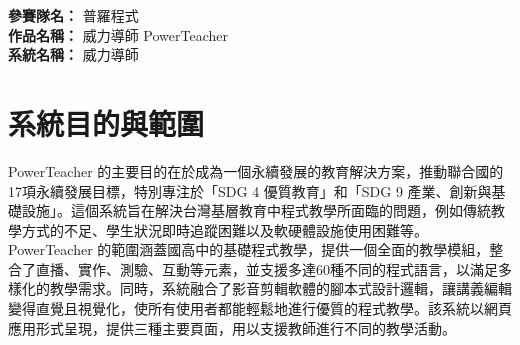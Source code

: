 \documentclass[12pt]{article}
\begin{document}
\date{}
\usetikzlibrary{automata, positioning, arrows}
{}
\renewcommand{\arraystretch}{1.25}

\noindent
\textbf{參賽隊名：} 普羅程式 \\
\textbf{作品名稱：} 威力導師 PowerTeacher \\
\textbf{系統名稱：} 威力導師

\section{系統目的與範圍}

PowerTeacher 的主要目的在於成為一個永續發展的教育解決方案，推動聯合國的17項永續發展目標，特別專注於「SDG 4 優質教育」和「SDG 9 產業、創新與基礎設施」。這個系統旨在解決台灣基層教育中程式教學所面臨的問題，例如傳統教學方式的不足、學生狀況即時追蹤困難以及軟硬體設施使用困難等。PowerTeacher 的範圍涵蓋國高中的基礎程式教學，提供一個全面的教學模組，整合了直播、實作、測驗、互動等元素，並支援多達60種不同的程式語言，以滿足多樣化的教學需求。同時，系統融合了影音剪輯軟體的腳本式設計邏輯，讓講義編輯變得直覺且視覺化，使所有使用者都能輕鬆地進行優質的程式教學。該系統以網頁應用形式呈現，提供三種主要頁面，用以支援教師進行不同的教學活動。\\
\end{document}
